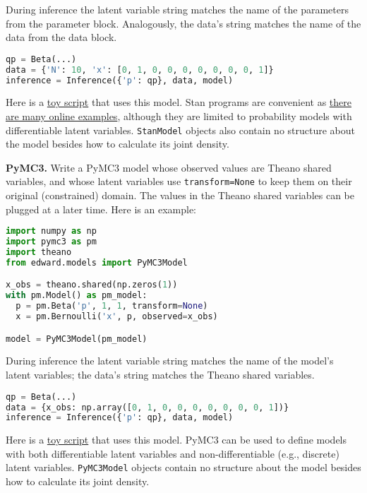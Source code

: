 During inference the latent variable string matches the name of the
parameters from the parameter block. Analogously, the data's string
matches the name of the data from the data block.

\begin{lstlisting}[language=Python]
qp = Beta(...)
data = {'N': 10, 'x': [0, 1, 0, 0, 0, 0, 0, 0, 0, 1]}
inference = Inference({'p': qp}, data, model)
\end{lstlisting}

Here is a
\href{https://github.com/blei-lab/edward/blob/master/examples/stan_beta_bernoulli.py}
{toy script}
that uses this model. Stan programs are convenient as
\href{https://github.com/stan-dev/example-models/wiki}
{there are many online examples},
although they are limited to probability models with differentiable
latent variables. \texttt{StanModel} objects also contain no structure about
the model besides how to calculate its joint density.

\textbf{PyMC3.}
Write a PyMC3 model whose observed values are Theano shared variables,
and whose latent variables use \texttt{transform=None} to keep them on their
original (constrained) domain.
The values in the Theano shared variables can be plugged at a later
time. Here is an example:

\begin{lstlisting}[language=Python]
import numpy as np
import pymc3 as pm
import theano
from edward.models import PyMC3Model

x_obs = theano.shared(np.zeros(1))
with pm.Model() as pm_model:
  p = pm.Beta('p', 1, 1, transform=None)
  x = pm.Bernoulli('x', p, observed=x_obs)

model = PyMC3Model(pm_model)
\end{lstlisting}

During inference the latent variable string matches the name of the
model's latent variables; the data's string matches the Theano shared
variables.

\begin{lstlisting}[language=Python]
qp = Beta(...)
data = {x_obs: np.array([0, 1, 0, 0, 0, 0, 0, 0, 0, 1])}
inference = Inference({'p': qp}, data, model)
\end{lstlisting}

Here is a
\href{https://github.com/blei-lab/edward/blob/master/examples/pymc3_beta_bernoulli.py}
{toy script}
that uses this model. PyMC3 can be used to define models with both
differentiable latent variables and non-differentiable (e.g., discrete)
latent variables. \texttt{PyMC3Model} objects contain no structure about the
model besides how to calculate its joint density.

